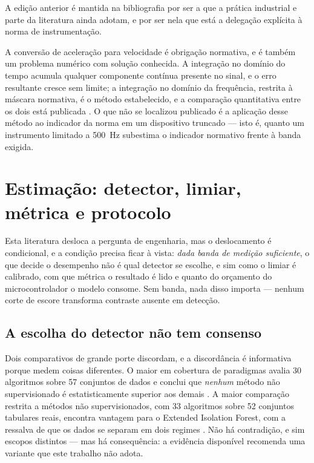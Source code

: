  A edição anterior
é mantida na bibliografia por ser a que a prática industrial e parte da literatura ainda
adotam, e por ser nela que está a delegação explícita à norma de instrumentação.

A conversão de aceleração para velocidade é obrigação normativa, e é também um problema
numérico com solução conhecida. A integração no domínio do tempo acumula qualquer
componente contínua presente no sinal, e o erro resultante cresce sem limite; a integração
no domínio da frequência, restrita à máscara normativa, é o método estabelecido, e a
comparação quantitativa entre os dois está publicada \cite{brandt2014}. O que não se
localizou publicado é a aplicação desse método ao indicador da norma em um dispositivo
truncado --- isto é, quanto um instrumento limitado a \SI{500}{\hertz} subestima o
indicador normativo frente à banda exigida.

\section{Estimação: detector, limiar, métrica e protocolo}
\label{sec:rev-estimacao}

Esta literatura desloca a pergunta de engenharia, mas o deslocamento é condicional, e a
condição precisa ficar à vista: \emph{dada banda de medição suficiente}, o que decide o
desempenho não é qual detector se escolhe, e sim como o limiar é calibrado, com que métrica
o resultado é lido e quanto do orçamento do microcontrolador o modelo consome. Sem banda,
nada disso importa --- nenhum corte de escore transforma contraste ausente em detecção.

\subsection{A escolha do detector não tem consenso}

Dois comparativos de grande porte discordam, e a discordância é informativa porque medem
coisas diferentes. O maior em cobertura de paradigmas avalia \num{30} algoritmos sobre
\num{57} conjuntos de dados e conclui que \emph{nenhum} método não supervisionado é
estatisticamente superior aos demais \cite{han2022}. A maior comparação restrita a métodos
não supervisionados, com \num{33} algoritmos sobre \num{52} conjuntos tabulares reais,
encontra vantagem para o Extended Isolation Forest, com a ressalva de que os dados se
separam em dois regimes \cite{bouman2024}. Não há contradição, e sim escopos distintos ---
mas há consequência: a evidência disponível recomenda uma variante que este trabalho não
adota.

